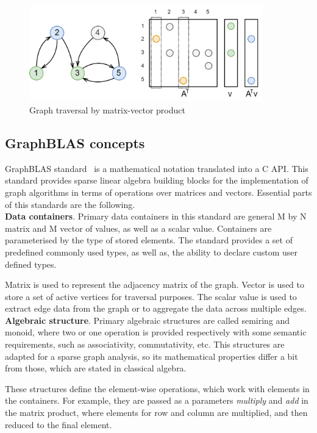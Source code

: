 \begin{figure}[h]
    \centering
    \includegraphics[width=0.9\textwidth]{images/graph_traversal_mxv.png}
    \caption{Graph traversal by matrix-vector product}
    \label{fig:gt_mxv}
\end{figure}

\subsection{GraphBLAS concepts}

GraphBLAS standard~\cite{paper:graphblas_foundations} is a mathematical notation translated into a C API. This standard provides sparse linear algebra building blocks for the implementation of graph algorithms in terms of operations over matrices and vectors. Essential parts of this standards are the following.\\

\textbf{Data containers}. Primary data containers in this standard are general M by N matrix and M vector of values, as well as a scalar value. Containers are parameterised by the type of stored elements. The standard provides a set of predefined commonly used types, as well as, the ability to declare custom user defined types. 

Matrix is used to represent the adjacency matrix of the graph. Vector is used to store a set of active vertices for traversal purposes. The scalar value is used to extract edge data from the graph or to aggregate the data across multiple edges.\\

\textbf{Algebraic structure}. Primary algebraic structures are called semiring and monoid, where two or one operation is provided respectively with some semantic requirements, such as associativity, commutativity, etc. This structures are adapted for a sparse graph analysis, so its mathematical properties differ a bit from those, which are stated in classical algebra.

These structures define the element-wise operations, which work with elements in the containers. For example, they are passed as a parameters \textit{multiply} and \textit{add} in the matrix product, where elements for row and column are multiplied, and then reduced to the final element.

